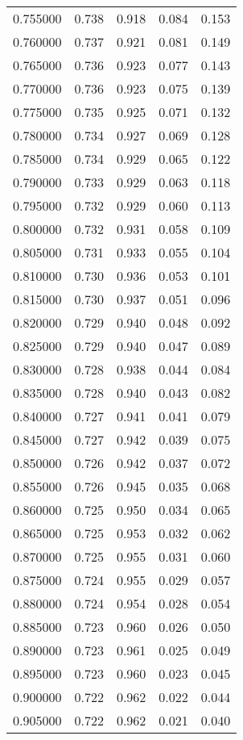 \begin{table}[htbp]
\begin{tabular}{lllll}
0.755000 & 0.738 & 0.918 & 0.084 & 0.153 \\
0.760000 & 0.737 & 0.921 & 0.081 & 0.149 \\
0.765000 & 0.736 & 0.923 & 0.077 & 0.143 \\
0.770000 & 0.736 & 0.923 & 0.075 & 0.139 \\
0.775000 & 0.735 & 0.925 & 0.071 & 0.132 \\
0.780000 & 0.734 & 0.927 & 0.069 & 0.128 \\
0.785000 & 0.734 & 0.929 & 0.065 & 0.122 \\
0.790000 & 0.733 & 0.929 & 0.063 & 0.118 \\
0.795000 & 0.732 & 0.929 & 0.060 & 0.113 \\
0.800000 & 0.732 & 0.931 & 0.058 & 0.109 \\
0.805000 & 0.731 & 0.933 & 0.055 & 0.104 \\
0.810000 & 0.730 & 0.936 & 0.053 & 0.101 \\
0.815000 & 0.730 & 0.937 & 0.051 & 0.096 \\
0.820000 & 0.729 & 0.940 & 0.048 & 0.092 \\
0.825000 & 0.729 & 0.940 & 0.047 & 0.089 \\
0.830000 & 0.728 & 0.938 & 0.044 & 0.084 \\
0.835000 & 0.728 & 0.940 & 0.043 & 0.082 \\
0.840000 & 0.727 & 0.941 & 0.041 & 0.079 \\
0.845000 & 0.727 & 0.942 & 0.039 & 0.075 \\
0.850000 & 0.726 & 0.942 & 0.037 & 0.072 \\
0.855000 & 0.726 & 0.945 & 0.035 & 0.068 \\
0.860000 & 0.725 & 0.950 & 0.034 & 0.065 \\
0.865000 & 0.725 & 0.953 & 0.032 & 0.062 \\
0.870000 & 0.725 & 0.955 & 0.031 & 0.060 \\
0.875000 & 0.724 & 0.955 & 0.029 & 0.057 \\
0.880000 & 0.724 & 0.954 & 0.028 & 0.054 \\
0.885000 & 0.723 & 0.960 & 0.026 & 0.050 \\
0.890000 & 0.723 & 0.961 & 0.025 & 0.049 \\
0.895000 & 0.723 & 0.960 & 0.023 & 0.045 \\
0.900000 & 0.722 & 0.962 & 0.022 & 0.044 \\
0.905000 & 0.722 & 0.962 & 0.021 & 0.040 \\

\end{tabular}
\end{table}

